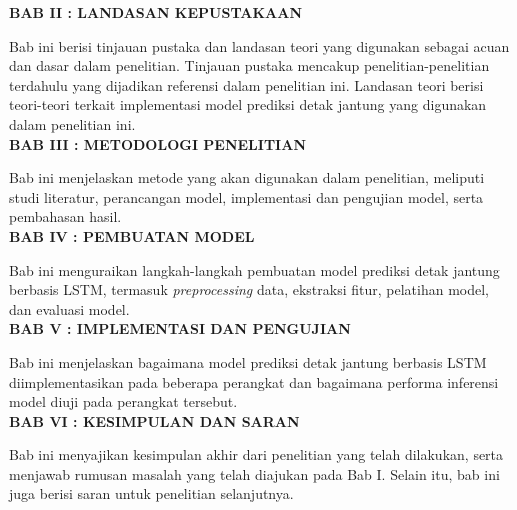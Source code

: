 \noindent
\textbf{BAB II : LANDASAN KEPUSTAKAAN}

Bab ini berisi tinjauan pustaka dan landasan teori yang digunakan sebagai acuan dan dasar dalam penelitian. Tinjauan pustaka mencakup penelitian-penelitian terdahulu yang dijadikan referensi dalam penelitian ini. Landasan teori berisi teori-teori terkait implementasi model prediksi detak jantung yang digunakan dalam penelitian ini.\\

\noindent
\textbf{BAB III : METODOLOGI PENELITIAN}

Bab ini menjelaskan metode yang akan digunakan dalam penelitian, meliputi studi literatur, perancangan model, implementasi dan pengujian model, serta pembahasan hasil.\\

\noindent
\textbf{BAB IV : PEMBUATAN MODEL}

Bab ini menguraikan langkah-langkah pembuatan model prediksi detak jantung berbasis LSTM, termasuk \textit{preprocessing} data, ekstraksi fitur, pelatihan model, dan evaluasi model.\\

\noindent
\textbf{BAB V : IMPLEMENTASI DAN PENGUJIAN}

Bab ini menjelaskan bagaimana model prediksi detak jantung berbasis LSTM diimplementasikan pada beberapa perangkat dan bagaimana performa inferensi model diuji pada perangkat tersebut.\\

\noindent
\textbf{BAB VI : KESIMPULAN DAN SARAN}

Bab ini menyajikan kesimpulan akhir dari penelitian yang telah dilakukan, serta menjawab rumusan masalah yang telah diajukan pada Bab I. Selain itu, bab ini juga berisi saran untuk penelitian selanjutnya.\\

